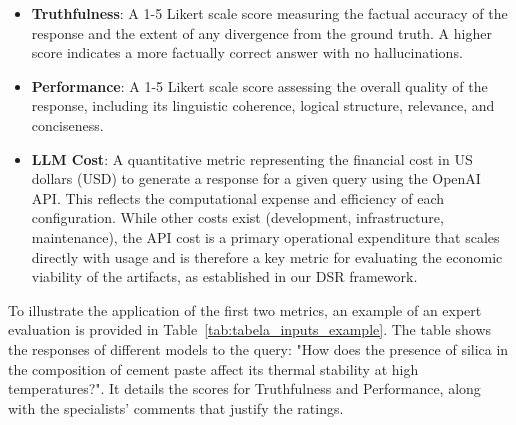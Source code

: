             \begin{itemize}

                \item \textbf{Truthfulness}: A 1-5 Likert scale score measuring the factual accuracy of the response and the extent of any divergence from the ground truth. A higher score indicates a more factually correct answer with no hallucinations.

                \item \textbf{Performance}: A 1-5 Likert scale score assessing the overall quality of the response, including its linguistic coherence, logical structure, relevance, and conciseness.

                \item \textbf{LLM Cost}: A quantitative metric representing the financial cost in US dollars (USD) to generate a response for a given query using the OpenAI API. This reflects the computational expense and efficiency of each configuration. While other costs exist (development, infrastructure, maintenance), the API cost is a primary operational expenditure that scales directly with usage and is therefore a key metric for evaluating the economic viability of the artifacts, as established in our DSR framework.
            
            \end{itemize}

            To illustrate the application of the first two metrics, an example of an expert evaluation is provided in Table~\ref{tab:tabela_inputs_example}. The table shows the responses of different models to the query: "How does the presence of silica in the composition of cement paste affect its thermal stability at high temperatures?". It details the scores for Truthfulness and Performance, along with the specialists' comments that justify the ratings.



